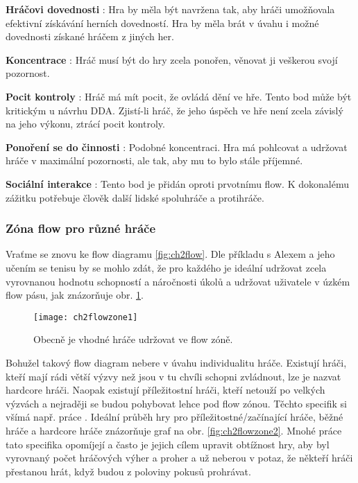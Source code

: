 \textbf{Hráčovi dovednosti} : 
Hra by měla být navržena tak, aby hráči umožňovala efektivní získávání herních dovedností. Hra by měla brát v úvahu i možné dovednosti získané hráčem z jiných her.

\textbf{Koncentrace} : 
Hráč musí být do hry zcela ponořen, věnovat ji veškerou svojí pozornost.

\textbf{Pocit kontroly} : 
Hráč má mít pocit, že ovládá dění ve hře. Tento bod může být kritickým u návrhu DDA. Zjistí-li hráč, že jeho úspěch ve hře není zcela závislý na jeho výkonu, ztrácí pocit kontroly.

\textbf{Ponoření se do činnosti} : 
Podobné koncentraci. Hra má pohlcovat a udržovat hráče v maximální pozornosti, ale tak, aby mu to bylo stále příjemné.

\textbf{Sociální interakce} : 
Tento bod je přidán oproti prvotnímu flow. K dokonalému zážitku potřebuje člověk další lidské spoluhráče a protihráče.

\subsubsection{Zóna flow pro různé hráče}

Vraťme se znovu ke flow diagramu \ref{fig:ch2flow}. Dle příkladu s Alexem a jeho učením se tenisu by se mohlo zdát, že pro každého je ideální udržovat zcela vyrovnanou hodnotu schopností a náročnosti úkolů a udržovat uživatele v úzkém flow pásu, jak znázorňuje obr. \ref{fig:ch2flowzone1}.

\begin{figure}
  \centering
  \texttt{[image: ch2flowzone1]}
	\caption{Obecně je vhodné hráče udržovat ve flow zóně. \cite{thesisflow} }
	\label{fig:ch2flowzone1}
\end{figure}	

Bohužel takový flow diagram nebere v úvahu individualitu hráče. Existují hráči, kteří mají rádi větší výzvy než jsou v tu chvíli schopni zvládnout, lze je nazvat hardcore hráči. Naopak existují příležitostní hráči, kteří netouží po velkých výzvách a nejraději se budou pohybovat lehce pod flow zónou. Těchto specifik si všímá např. práce \cite{RiskTakers}. Ideální průběh hry pro příležitostné/začínající hráče, běžné hráče a hardcore hráče znázorňuje graf na obr. \ref{fig:ch2flowzone2}. Mnohé práce tato specifika opomíjejí a často je jejich cílem upravit obtížnost hry, aby byl vyrovnaný počet hráčových výher a proher a už neberou v potaz, že někteří hráči přestanou hrát, když budou z poloviny pokusů prohrávat.


